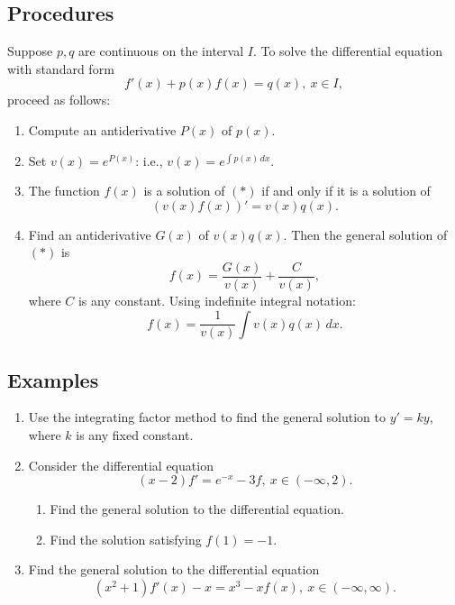 


\subsection*{Procedures}
\begin{namedtheorem} Suppose $p, q$ are continuous on the interval $I$. To solve the differential equation with standard form
  \[
  f'(x)+p(x)f(x)=q(x), \ x\in I, \tag{$*$}
  \]
 proceed as follows:
 \begin{enumerate}
   \item Compute an antiderivative $P(x)$ of $p(x)$.
   \item Set $v(x)=e^{P(x)}$: i.e., $v(x)=e^{\int p(x)\, dx}$.
   \item The function $f(x)$ is a solution of $(*)$ if and only if it is a solution of
   \[
   (v(x)f(x))'=v(x)q(x).
   \]
   \item Find an antiderivative $G(x)$ of $v(x)q(x)$. Then the general solution of $(*)$ is
   \[
   f(x)=\frac{G(x)}{v(x)}+\frac{C}{v(x)},
   \]
   where $C$ is any constant. Using indefinite integral notation:
   \[
   f(x)=\frac{1}{v(x)}\int v(x)q(x)\, dx.
   \]
 \end{enumerate}
\end{namedtheorem}

\subsection*{Examples}
\begin{enumerate}
  \item Use the integrating factor method to find the general solution to $y'=k y$, where $k$ is any fixed constant.
  \item Consider the differential equation
  \[
  (x-2)f'=e^{-x}-3f, \ x\in (-\infty, 2).
  \]
  \begin{enumerate}
    \item Find the general solution to the differential equation.
    \item Find the solution satisfying $f(1)=-1$.
  \end{enumerate}
  \item Find the general solution to the differential equation
  \[
  (x^2+1)f'(x)-x=x^3-xf(x), \  x\in (-\infty, \infty).
  \]
\end{enumerate}





